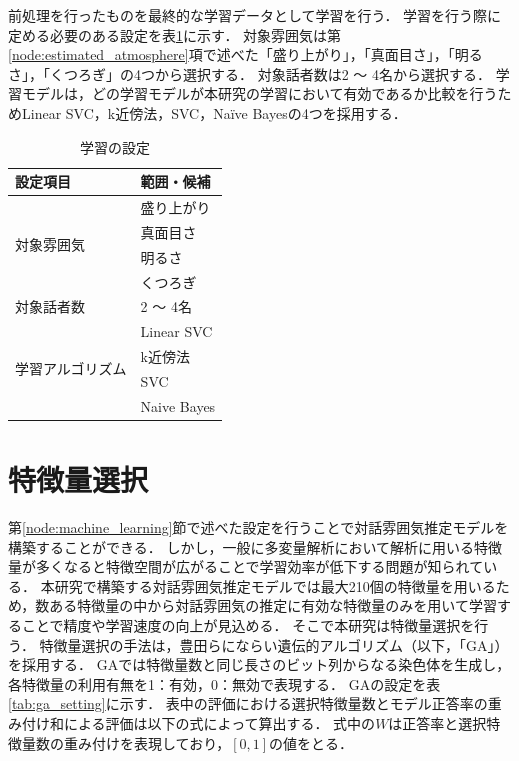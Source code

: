 前処理を行ったものを最終的な学習データとして学習を行う．
学習を行う際に定める必要のある設定を表\ref{tab:learning_setting}に示す．
対象雰囲気は第\ref{node:estimated_atmosphere}項で述べた「盛り上がり」，「真面目さ」，「明るさ」，「くつろぎ」の4つから選択する．
対象話者数は2 〜 4名から選択する．
学習モデルは，どの学習モデルが本研究の学習において有効であるか比較を行うためLinear SVC，k近傍法，SVC，Naïve Bayesの4つを採用する．

\begin{table}[t]
    \caption{学習の設定}
    \centering
    \begin{tabular}{ll}
        \hline
        設定項目 & 範囲・候補 \\ \hline\hline
        \multirow{4}{*}{対象雰囲気} & 盛り上がり \\
        & 真面目さ \\
        & 明るさ \\
        & くつろぎ \\ \hline
        対象話者数 & 2 〜 4名 \\ \hline
        \multirow{4}{*}{学習アルゴリズム} & Linear SVC \\
        & k近傍法 \\
        & SVC \\
        & Naive Bayes \\ \hline
    \end{tabular}
    \label{tab:learning_setting}
\end{table}

\section{特徴量選択}

第\ref{node:machine_learning}節で述べた設定を行うことで対話雰囲気推定モデルを構築することができる．
しかし，一般に多変量解析において解析に用いる特徴量が多くなると特徴空間が広がることで学習効率が低下する問題が知られている．
本研究で構築する対話雰囲気推定モデルでは最大210個の特徴量を用いるため，数ある特徴量の中から対話雰囲気の推定に有効な特徴量のみを用いて学習することで精度や学習速度の向上が見込める．
そこで本研究は特徴量選択を行う．
特徴量選択の手法は，豊田らにならい遺伝的アルゴリズム（以下，「GA」）を採用する．
GAでは特徴量数と同じ長さのビット列からなる染色体を生成し，各特徴量の利用有無を1：有効，0：無効で表現する．
GAの設定を表\ref{tab:ga_setting}に示す．
表中の評価における選択特徴量数とモデル正答率の重み付け和による評価は以下の式によって算出する．
式中の$W$は正答率と選択特徴量数の重み付けを表現しており，$[0, 1]$の値をとる．

